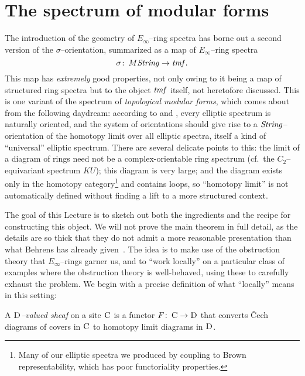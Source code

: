 \section{The spectrum of modular forms}\label{ConstructionOfTMFSection}

The introduction of the geometry of \(E_\infty\)--ring spectra has borne out a second version of the \(\sigma\)--orientation, summarized as a map of \(E_\infty\)--ring spectra \[\sigma\colon\thinspace M\mathit{String} \to \mathit{tmf}.\]  This map has \emph{extremely} good properties, not only owing to it being a map of structured ring spectra but to the object \(\mathit{tmf}\) itself, not heretofore discussed.  This is one variant of the spectrum of \textit{topological modular forms}, which comes about from the following daydream: according to  and , every elliptic spectrum is naturally oriented, and the system of orientations should give rise to a \(\mathit{String}\)--orientation of the homotopy limit over all elliptic spectra, itself a kind of ``universal'' elliptic spectrum.  There are several delicate points to this: the limit of a diagram of rings need not be a complex-orientable ring spectrum (cf.\ the \(C_2\)--equivariant spectrum \(KU\)); this diagram is very large; and the diagram exists only in the homotopy category\footnote{Many of our elliptic spectra we produced by coupling  to Brown representability, which has poor functoriality properties.} and contains loops, so ``homotopy limit'' is not automatically defined without finding a lift to a more structured context.

The goal of this Lecture is to sketch out both the ingredients and the recipe for constructing this object.  We will not prove the main theorem in full detail, as the details are so thick that they do not admit a more reasonable presentation than what Behrens has already given~\cite{BehrensConstruction}.  The idea is to make use of the obstruction theory that \(E_\infty\)--rings garner us, and to ``work locally'' on a particular class of examples where the obstruction theory is well-behaved, using these to carefully exhaust the problem.  We begin with a precise definition of what ``locally'' means in this setting:

\begin{definition}
A \textit{\(\normalfont\textsc{D}\)--valued sheaf} on a site \(\normalfont\textsc{C}\) is a functor \(F\colon\thinspace \normalfont\textsc{C} \to \normalfont\textsc{D}\) that converts \v{C}ech diagrams of covers in $\normalfont\textsc{C}$ to homotopy limit diagrams in $\normalfont\textsc{D}$.
\end{definition}

